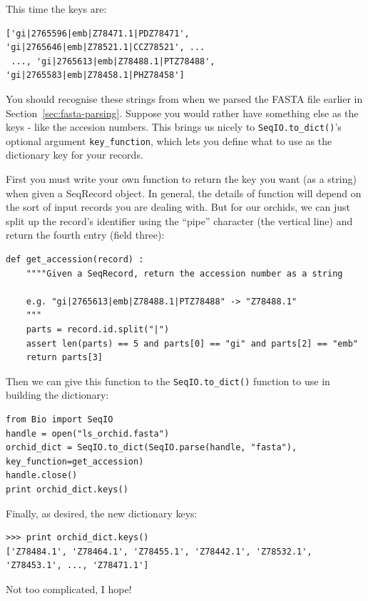\documentclass{report}
\begin{document}
\noindent This time the keys are:

\begin{verbatim}
['gi|2765596|emb|Z78471.1|PDZ78471', 'gi|2765646|emb|Z78521.1|CCZ78521', ...
 ..., 'gi|2765613|emb|Z78488.1|PTZ78488', 'gi|2765583|emb|Z78458.1|PHZ78458']
\end{verbatim} 

You should recognise these strings from when we parsed the FASTA file earlier in Section~\ref{sec:fasta-parsing}.  Suppose you would rather have something else as the keys - like the accesion numbers.  This brings us nicely to \verb|SeqIO.to_dict()|'s optional argument \verb|key_function|, which lets you define what to use as the dictionary key for your records.

First you must write your own function to return the key you want (as a string) when given a SeqRecord object.  In general, the details of function will depend on the sort of input records you are dealing with.  But for our orchids, we can just split up the record's identifier using the ``pipe'' character (the vertical line) and return the fourth entry (field three):

\begin{verbatim}
def get_accession(record) :
    """"Given a SeqRecord, return the accession number as a string
    
    e.g. "gi|2765613|emb|Z78488.1|PTZ78488" -> "Z78488.1"
    """
    parts = record.id.split("|")
    assert len(parts) == 5 and parts[0] == "gi" and parts[2] == "emb"
    return parts[3]
\end{verbatim} 

\noindent Then we can give this function to the \verb|SeqIO.to_dict()| function to use in building the dictionary:

\begin{verbatim}
from Bio import SeqIO
handle = open("ls_orchid.fasta")
orchid_dict = SeqIO.to_dict(SeqIO.parse(handle, "fasta"), key_function=get_accession)
handle.close()
print orchid_dict.keys()
\end{verbatim} 

\noindent Finally, as desired, the new dictionary keys:

\begin{verbatim}
>>> print orchid_dict.keys()
['Z78484.1', 'Z78464.1', 'Z78455.1', 'Z78442.1', 'Z78532.1', 'Z78453.1', ..., 'Z78471.1']
\end{verbatim}

\noindent Not too complicated, I hope!
\end{document}
